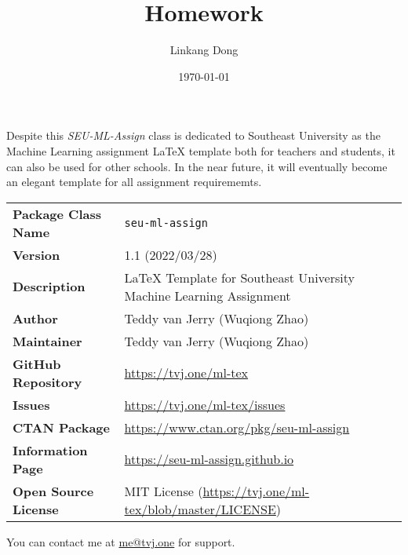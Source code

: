 \documentclass[oneside]{seu-ml-assign}
\title{Homework}
\author{Linkang Dong}
\date{\today}
\newcommand{\grayrow}{\rowcolor[rgb]{ .906,  .902,  .902}}
\begin{document}
  \maketitle


    Despite this \textit{SEU-ML-Assign} class is dedicated to Southeast University as the Machine Learning assignment \LaTeX{} template both for teachers and students, it can also be used for other schools.
    In the near future, it will eventually become an elegant template for all assignment requirememts.

    \begin{table}[htbp]
      \bgroup
        \def\arraystretch{1.2}
        \setlength{\tabcolsep}{1.5em}
        \begin{tabular}{ll}
        \toprule
          \grayrow \textbf{Package Class Name} & \texttt{seu-ml-assign} \\
          \textbf{Version} & 1.1 (2022/03/28) \\
          \grayrow \textbf{Description} & \LaTeX{} Template for Southeast University Machine Learning Assignment \\
          \textbf{Author} & Teddy van Jerry (Wuqiong Zhao) \\
          \grayrow \textbf{Maintainer} & Teddy van Jerry (Wuqiong Zhao) \\
          \textbf{GitHub Repository} & \url{https://tvj.one/ml-tex} \\
          \grayrow \textbf{Issues} & \url{https://tvj.one/ml-tex/issues} \\
          \textbf{CTAN Package} & \url{https://www.ctan.org/pkg/seu-ml-assign} \\
          \grayrow \textbf{Information Page} & \url{https://seu-ml-assign.github.io} \\
          \textbf{Open Source License} & MIT License (\url{https://tvj.one/ml-tex/blob/master/LICENSE}) \\
        \bottomrule
        \end{tabular}%
      \egroup
    \end{table}

    You can contact me at \href{mailto:me@tvj.one}{me@tvj.one} for support.

\end{document}
